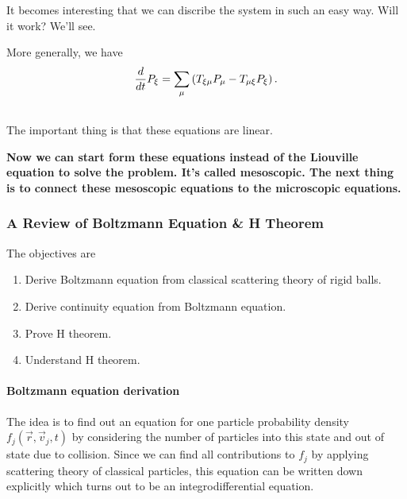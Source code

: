 \documentclass[letterpaper,10pt,english]{sphinxmanual}
\begin{document}
It becomes interesting that we can discribe the system in such an easy way. Will it work? We'll see.

More generally, we have
\begin{gather}
\begin{split}\frac{d}{d t} P_\xi = \sum_\mu \left( T_{\xi\mu}P_\mu - T_{\mu\xi} P_{\xi} \right) .\end{split}\notag\\\begin{split}\end{split}\notag
\end{gather}
The important thing is that these equations are linear.

\textbf{Now we can start form these equations instead of the Liouville equation to solve the problem. It's called mesoscopic. The next thing is to connect these mesoscopic equations to the microscopic equations.}


\subsubsection{A Review of Boltzmann Equation \& H Theorem}
\label{nonequilibrium/week8:a-review-of-boltzmann-equation-h-theorem}
The objectives are
\begin{enumerate}
\item {} 
Derive Boltzmann equation from classical scattering theory of rigid balls.

\item {} 
Derive continuity equation from Boltzmann equation.

\item {} 
Prove H theorem.

\item {} 
Understand H theorem.

\end{enumerate}


\paragraph{Boltzmann equation derivation}
\label{nonequilibrium/week8:boltzmann-equation-derivation}
The idea is to find out an equation for one particle probability density $f_j(\vec r, \vec v_j,t)$ by considering the number of particles into this state and out of state due to collision. Since we can find all contributions to $f_j$ by applying scattering theory of classical particles, this equation can be written down explicitly which turns out to be an integrodifferential equation.
\end{document}
